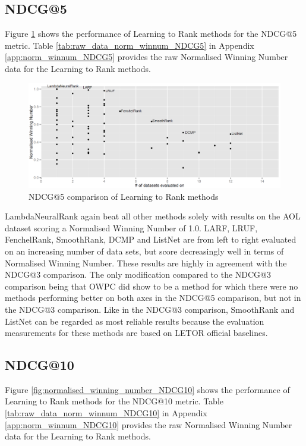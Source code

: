 \subsection{NDCG@5}
Figure \ref{fig:normalised_winning_number_NDCG5} shows the performance of Learning to Rank methods for the \ac{NDCG}@5 metric. Table \ref{tab:raw_data_norm_winnum_NDCG5} in Appendix \ref{app:norm_winnum_NDCG5} provides the raw Normalised Winning Number data for the Learning to Rank methods.\\

\begin{figure}[!h]
\includegraphics[scale=0.285]{gfx/ndcg5_winnum}
\caption{\acs{NDCG}@5 comparison of Learning to Rank methods}
\label{fig:normalised_winning_number_NDCG5}
\end{figure}

LambdaNeuralRank again beat all other methods solely with results on the AOL dataset scoring a Normalised Winning Number of 1.0. LARF, LRUF, FenchelRank, SmoothRank, DCMP and ListNet are from left to right evaluated on an increasing number of data sets, but score decreasingly well in terms of Normalised Winning Number. These results are highly in agreement with the \ac{NDCG}@3 comparison. The only modification compared to the \ac{NDCG}@3 comparison being that OWPC did show to be a method for which there were no methods performing better on both axes in the \ac{NDCG}@5 comparison, but not in the \ac{NDCG}@3 comparison. Like in the \ac{NDCG}@3 comparison, SmoothRank and ListNet can be regarded as most reliable results because the evaluation measurements for these methods are based on LETOR official baselines.

\subsection{NDCG@10}
Figure \ref{fig:normalised_winning_number_NDCG10} shows the performance of Learning to Rank methods for the \ac{NDCG}@10 metric. Table \ref{tab:raw_data_norm_winnum_NDCG10} in Appendix \ref{app:norm_winnum_NDCG10} provides the raw Normalised Winning Number data for the Learning to Rank methods.\\

